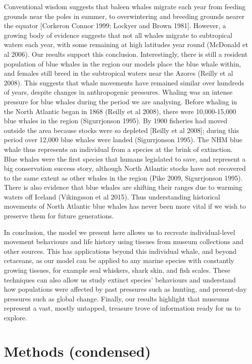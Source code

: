 \documentclass[a4paper,12pt]{article}
\begin{document}
Conventional wisdom suggests that baleen whales migrate each year from feeding grounds near the poles in summer, to overwintering and breeding grounds nearer the equator [Corkeron  Connor 1999; Lockyer and Brown 1981]. 
However, a growing body of evidence suggests that not all whales migrate to subtropical waters each year, with some remaining at high latitudes year round (McDonald et al 2006). Our results support this conclusion. 
Interestingly, there is still a resident population of blue whales in the region our models place the blue whale within, and females still breed in the subtropical waters near the Azores (Reilly et al 2008). 
This suggests that whale movements have remained similar over hundreds of years, despite changes in anthropogenic pressures. Whaling was an intense pressure for blue whales during the period we are analysing. 
Before whaling in the North Atlantic began in 1868 (Reilly et al 2008), there were 10,000-15,000 blue whales in the region (Sigurrjonson 1995). 
By 1900 fisheries had moved outside the area because stocks were so depleted [Reilly et al 2008]; during this period over 12,000 blue whales were landed (Sigurrjonson 1995). 
The NHM blue whale thus represents an individual from a species at the brink of extinction. 
Blue whales were the first species that humans legislated to save, and represent a big conservation success story, although North Atlantic stocks have not recovered to the same extent as other whales in the region (Pike 2009, Sigurrjonson 1995). 
There is also evidence that blue whales are shifting their ranges due to warming waters off Iceland (Vikingsson et al 2015). 
Thus understanding historical movements of North Atlantic blue whales has never been more vital if we wish to preserve them for future generations.
 
In conclusion, the model we present here allows us to recreate individual-level movement behaviours and life history using tissues from museum collections and other sources. 
This has applications beyond this individual whale, and beyond cetaceans, as our model can be applied to any marine species with constantly growing tissues, for example seal whiskers, shark skin, and fish scales. 
These techniques can also allow us study extinct species' behaviours and understand how populations were affected by past pressures such as hunting, and present-day pressures such as global change. 
Finally, our results highlight that museums represent a vast, mostly untapped, treasure trove of information ready for us to explore.


\section{Methods (condensed)}
\end{document}
